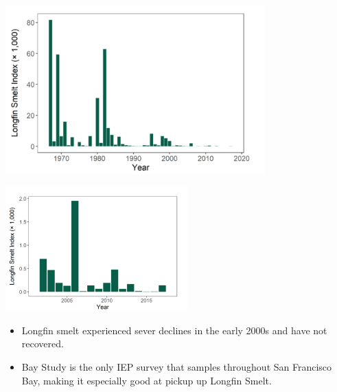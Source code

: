 \documentclass[]{article}\usepackage[]{graphicx}\usepackage[]{color}
\begin{document}
\begin{Row}
  \begin{Cell}{7}
    \begin{center}
      \includegraphics[width=10cm,trim=0 0 0 40,clip,align=m]{figures/smelt/longfin_tmp.png}
    \end{center}
  \end{Cell}
  \begin{Cell}{6}
    \begin{center}
      \vspace{-3cm}
      \includegraphics[width=7cm,trim=0 0 0 50,clip,align=m]{figures/smelt/longfin_tmp_2.png}
      \begin{itemize}[leftmargin=*]
        \item Longfin smelt experienced sever declines in the early 2000s and have 
        not recovered. 
        \item Bay Study is the only IEP survey that samples throughout San Francisco Bay, 
        making it especially good at pickup up Longfin Smelt.
      \end{itemize}
    \end{center}
  \end{Cell}
\end{Row}

\vspace{0.5cm}
\end{document}
